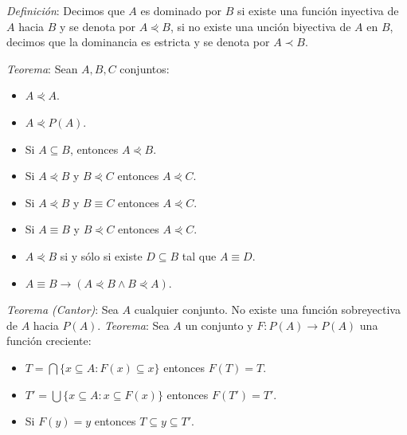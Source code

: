 \documentclass{beamer}
\begin{document}
  \begin{frame}
    \textit{Definición}: Decimos que $A$ es dominado por $B$ si existe 
    una función inyectiva de $A$ hacia $B$ y se denota por 
    $A \curlyeqprec B$, si no existe una unción biyectiva de $A$ en 
    $B$, decimos que la dominancia es estricta y se denota por $A \prec B$.
    \newline\newline
    \pause
    
    \textit{Teorema}: Sean $A, B, C$ conjuntos: 
    \pause
    \begin{itemize}[<+->]
      \item $A \curlyeqprec A$.
      \item $A \curlyeqprec P(A)$.
      \item Si $A \subseteq B$, entonces $A \curlyeqprec B$.
      \item Si $A \curlyeqprec B$ y $B \curlyeqprec C$ entonces $A \curlyeqprec C$.
      \item Si $A \curlyeqprec B$ y $B \equiv C$ entonces $A \curlyeqprec C$.
      \item Si $A \equiv B$ y $B \curlyeqprec C$ entonces $A \curlyeqprec C$.
      \item $A \curlyeqprec B$ si y sólo si existe $D \subseteq B$ tal que $A \equiv D$.
      \item $A \equiv B \rightarrow (A \curlyeqprec B \land B \curlyeqprec A)$.
    \end{itemize}
  \end{frame}

  \begin{frame}
    \textit{Teorema (Cantor)}: Sea $A$ cualquier conjunto. No existe una 
    función sobreyectiva de $A$ hacia $P(A)$.
    \newline\newline
    \pause
    \textit{Teorema}: Sea $A$ un conjunto y $F: P(A) \to P(A)$ una función
    creciente:
    \pause

    \begin{itemize}[<+->]
      \item $T = \bigcap \{x \subseteq A: F(x) \subseteq x\}$ entonces $F(T) = T$.
      \item $T' = \bigcup \{x \subseteq A: x \subseteq F(x)\}$ entonces $F(T') = T'$.
      \item Si $F(y) = y$ entonces $T \subseteq y  \subseteq T'$.
    \end{itemize}
  \end{frame}
\end{document}
